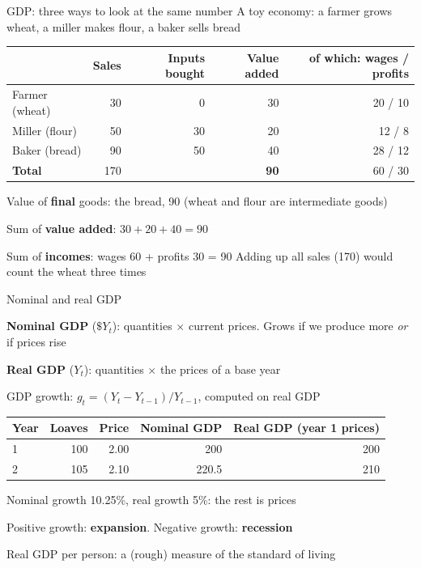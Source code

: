 \documentclass[aspectratio=169,xcolor=table]{beamer}
\begin{document}
\begin{frame}{GDP: three ways to look at the same number}
\small
A toy economy: a farmer grows wheat, a miller makes flour, a baker sells bread
\vspace{0.1cm}

\centering\footnotesize
\begin{tabular}{lrrrr}
\toprule
 & \textbf{Sales} & \textbf{Inputs bought} & \textbf{Value added} & \textbf{of which: wages / profits}\\
\midrule
Farmer (wheat) & 30 & 0 & 30 & 20 / 10 \\
Miller (flour) & 50 & 30 & 20 & 12 / 8 \\
Baker (bread)  & 90 & 50 & 40 & 28 / 12 \\
\midrule
\textbf{Total} & 170 & & \textbf{90} & 60 / 30 \\
\bottomrule
\end{tabular}
\vspace{0.15cm}

\raggedright\small
\be
  \item Value of \textbf{final} goods: the bread, 90 (wheat and flour are intermediate goods)
  \item Sum of \textbf{value added}: $30 + 20 + 40 = 90$
  \item Sum of \textbf{incomes}: wages 60 + profits 30 = 90
\ee
Adding up all sales (170) would count the wheat three times
\end{frame}

\begin{frame}{Nominal and real GDP}
\small
\bi
  \item \textbf{Nominal GDP} ($\$Y_t$): quantities $\times$ current prices. Grows if we produce more \emph{or} if prices rise
  \item \textbf{Real GDP} ($Y_t$): quantities $\times$ the prices of a base year
  \item GDP growth: $g_t = (Y_t - Y_{t-1})/Y_{t-1}$, computed on real GDP
\ei
\vspace{0.1cm}
\centering\footnotesize
\begin{tabular}{lrrrr}
\toprule
\textbf{Year} & \textbf{Loaves} & \textbf{Price} & \textbf{Nominal GDP} & \textbf{Real GDP (year 1 prices)}\\
\midrule
1 & 100 & 2.00 & 200 & 200 \\
2 & 105 & 2.10 & 220.5 & 210 \\
\bottomrule
\end{tabular}
\vspace{0.1cm}

\raggedright\small
Nominal growth 10.25\%, real growth 5\%: the rest is prices
\bi
  \item Positive growth: \textbf{expansion}. Negative growth: \textbf{recession}
  \item Real GDP per person: a (rough) measure of the standard of living
\ei
\end{frame}
\end{document}
